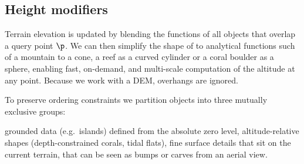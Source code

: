 \subsection{Height modifiers}
Terrain elevation is updated by blending the  functions of all objects that overlap a query point $\p$. We can then simplify the shape of  to analytical functions such of a mountain to a cone, a reef as a curved cylinder or a coral boulder as a sphere, enabling fast, on-demand, and multi-scale computation of the altitude at any point. Because we work with a DEM, overhangs are ignored.

To preserve ordering constraints we partition objects into three mutually exclusive groups:
\begin{Itemize}
  \Item{$\groundedHeight$} grounded data (e.g.\ islands) defined from the absolute zero level,
  \Item{$\altitudeHeight$} altitude-relative shapes (depth-constrained corals, tidal flats),
  \Item{$\surfaceHeight$} fine surface details that sit on the current terrain, that can be seen as bumps or carves from an aerial view. 
\end{Itemize}













